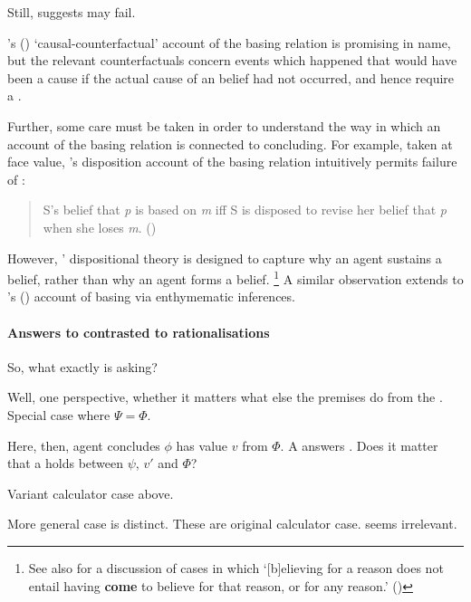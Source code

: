 \begin{note}
  Still, suggests \issueInclusion{} may fail.

  \citeauthor{Swain:1981wd}'s (\citeyear{Swain:1981wd}) `causal-counterfactual' account of the basing relation is promising in name, but the relevant counterfactuals concern events which happened that would have been a cause if the actual cause of an \agents{} belief had not occurred, and hence require a .

  Further, some care must be taken in order to understand the way in which an account of the basing relation is connected to concluding.
  For example, taken at face value, \citeauthor{Evans:2013tw}'s disposition account of the basing relation intuitively permits failure of \issueConstraint{}:

  \begin{quote}
    S's belief that \emph{p} is based on \emph{m} iff S is disposed to revise her belief that \emph{p} when she loses \emph{m}.%
    \mbox{}\hfill\mbox{(\citeyear[2952]{Evans:2013tw})}
  \end{quote}

  However, \citeauthor{Evans:2013tw}' dispositional theory is designed to capture why an agent sustains a belief, rather than why an agent forms a belief.%
  \footnote{
    See also \textcite{Audi:1986to} for a discussion of cases in which `[b]elieving for a reason does not entail having \textbf{come} to believe for that reason, or for any reason.' (\citeyear[32--33]{Audi:1986to})
  }
  A similar observation extends to \citeauthor{Moretti:2019wx}'s (\citeyear{Moretti:2019wx}) account of basing via enthymematic inferences.
\end{note}

\paragraph{Answers to \qWhy{} contrasted to rationalisations}

\begin{note}
  So, what exactly is \qWhy{} asking?

  Well, one perspective, whether it matters what else the premises do from the \agpe{}.
  Special case where \(\Psi = \Phi\).

  Here, then, agent concludes \(\phi\) has value \(v\) from \(\Phi\).
  A \ros{} answers \qWhy{}.
  Does it matter that a \ros{} holds between \(\psi\), \(v'\) and \(\Phi\)?

  Variant calculator case above.

  More general case is distinct.
  These are original calculator case.
  \ros{} seems irrelevant.
\end{note}

